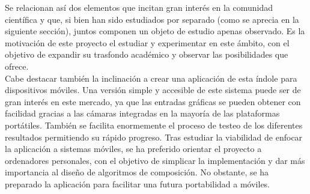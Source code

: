 Se relacionan así dos elementos que incitan gran interés en la comunidad científica y que, si bien han sido estudiados por separado (como se aprecia en la siguiente sección), juntos componen un objeto de estudio apenas observado. Es la motivación de este proyecto el estudiar y experimentar en este ámbito, con el objetivo de expandir su trasfondo académico y observar las posibilidades que ofrece.\\

Cabe destacar también la inclinación a crear una aplicación de esta índole para dispositivos móviles. Una versión simple y accesible de este sistema puede ser de gran interés en este mercado, ya que las entradas gráficas se pueden obtener con facilidad gracias a las cámaras integradas en la mayoría de las plataformas portátiles. También se facilita enormemente el proceso de testeo de los diferentes resultados permitiendo su rápido progreso. Tras estudiar la viabilidad de enfocar la aplicación a sistemas móviles, se ha preferido orientar el proyecto a ordenadores personales, con el objetivo de simplicar la implementación y dar más importancia al diseño de algoritmos de composición. No obstante, se ha preparado la aplicación para facilitar una futura portabilidad a móviles.\\